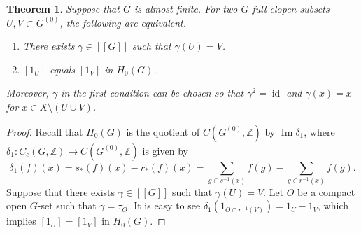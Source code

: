 \documentclass[11pt]{article}
\newtheorem{thm}{Theorem}[section]
\theoremstyle{definition}
\newcommand{\Ima}{\operatorname{Im}}
\newcommand{\id}{\operatorname{id}}
\newcommand{\Z}{\mathbb{Z}}
\begin{document}
\begin{thm}\label{Hopf2}
Suppose that $G$ is almost finite. 
For two $G$-full clopen subsets $U,V\subset G^{(0)}$, 
the following are equivalent. 
\begin{enumerate}
\item There exists $\gamma\in[[G]]$ such that $\gamma(U)=V$. 
\item $[1_U]$ equals $[1_V]$ in $H_0(G)$. 
\end{enumerate}
Moreover, $\gamma$ in the first condition can be chosen so that 
$\gamma^2=\id$ and $\gamma(x)=x$ for $x\in X\setminus(U\cup V)$. 
\end{thm}
\begin{proof}
Recall that 
$H_0(G)$ is the quotient of $C(G^{(0)},\Z)$ by $\Ima\delta_1$, 
where $\delta_1:C_c(G,\Z)\to C(G^{(0)},\Z)$ is given by 
\[
\delta_1(f)(x)=s_*(f)(x)-r_*(f)(x)
=\sum_{g\in s^{-1}(x)}f(g)-\sum_{g\in r^{-1}(x)}f(g). 
\]
Suppose that there exists $\gamma\in[[G]]$ such that $\gamma(U)=V$. 
Let $O$ be a compact open $G$-set such that $\gamma=\tau_O$. 
It is easy to see $\delta_1(1_{O\cap r^{-1}(V)})=1_U-1_V$, 
which implies $[1_U]=[1_V]$ in $H_0(G)$. 


\end{proof}
\end{document}
